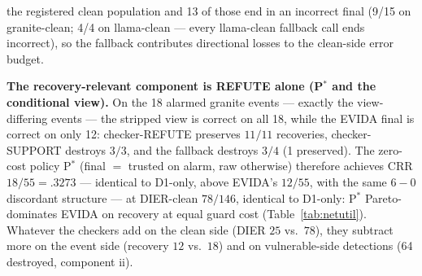 \documentclass[sigconf,nonacm]{acmart}
\begin{document}
the registered clean population and 13 of those end in an incorrect
final (9/15 on granite-clean; 4/4 on llama-clean --- every llama-clean
fallback call ends incorrect), so the fallback contributes directional
losses to the clean-side error budget.

\textbf{The recovery-relevant component is REFUTE alone (P$^{*}$ and the
conditional view).} On the 18 alarmed granite events --- exactly the
view-differing events --- the stripped view is correct on all 18, while
the EVIDA final is correct on only 12: checker-REFUTE preserves
$11/11$ recoveries, checker-SUPPORT destroys $3/3$, and the fallback
destroys $3/4$ (1 preserved). The zero-cost policy P$^{*}$ (final
$=$ trusted on alarm, raw otherwise) therefore achieves CRR $18/55
{=}.3273$ --- identical to D1-only, above EVIDA's $12/55$, with the same
$6{-}0$ discordant structure --- at DIER-clean $78/146$, identical to
D1-only: P$^{*}$ Pareto-dominates EVIDA on recovery at equal guard cost
(Table~\ref{tab:netutil}). Whatever the checkers add on the clean side
(DIER $25$ vs.\ $78$), they subtract more on the event side (recovery
$12$ vs.\ $18$) and on vulnerable-side detections (64 destroyed,
component ii).
\end{document}

